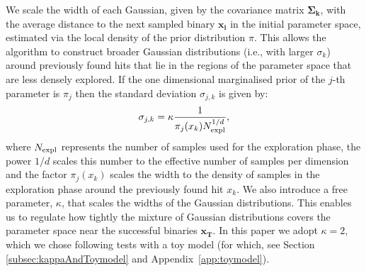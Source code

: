 \documentclass[a4paper,fleqn,usenatbib,useAMS,usedcolumn]{mnras}
\begin{document}
We scale the width of each Gaussian, given by the  covariance matrix $\boldsymbol{ \Sigma_k}$,  with the average distance to the next sampled binary $ \boldsymbol{x_i}$ in the initial parameter space, estimated via the local density of the prior distribution $\pi$. This allows the algorithm to construct broader Gaussian distributions (i.e., with larger $\sigma_k$) around previously found hits that lie in the regions of the parameter space that are less densely explored.  
If the one dimensional marginalised prior of the $j$-th parameter is $\pi_j$ then the standard deviation $\sigma_{j,k}$ is given by:
\begin{equation}
		\sigma_{j,k} = \kappa \frac{1}{\pi_j(x_k) N_{\rm{expl}}^{1/d}},    
\label{eq:sigmajk}
\end{equation}
where $N_{\rm{expl}}$ represents the number of samples used for the exploration phase,  the power ${1/d}$ scales this number to the effective number of samples per dimension and the factor $\pi_j(x_k)$ scales the width to the density of samples in the exploration phase around the previously found hit $x_k$. We also introduce a free parameter, $\kappa$, that scales the widths of the Gaussian distributions.  This enables us to regulate how tightly the mixture of Gaussian distributions covers the parameter space near the successful binaries $\boldsymbol{ x_{\text{T}}}$.
In this paper we adopt $\kappa = 2$, which we chose following tests with a toy model (for which, see Section \ref{subsec:kappaAndToymodel} and Appendix~\ref{app:toymodel}).
\end{document}
